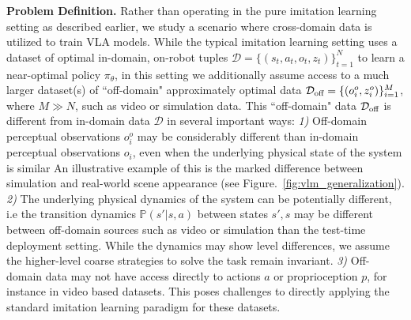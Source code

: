 \textbf{Problem Definition.}
Rather than operating in the pure imitation learning setting as described earlier, we study a scenario where cross-domain data is utilized to train VLA models. While the typical imitation learning setting uses a dataset of optimal in-domain, on-robot tuples $\mathcal{D} = \{(s_t, a_t, o_t, z_t)\}_{t=1}^N$ to learn a near-optimal policy $\pi_\theta$, in this setting we additionally assume access to a much larger dataset(s) of ``off-domain" approximately optimal data $\mathcal{D}_\text{off} = \{(o_i^o, z_i^o)\}_{i=1}^M$, where $M \gg N$, such as video or simulation data. This ``off-domain" data $\mathcal{D}_\text{off}$ is different from in-domain data $\mathcal{D}$ in several important ways: \emph{1)} Off-domain perceptual observations $o_i^o$ may be considerably different than in-domain perceptual observations $o_i$, even when the underlying physical state of the system is similar
An illustrative example of this is the marked difference between simulation and real-world scene appearance (see Figure.~\ref{fig:vlm_generalization}). \emph{2)} The underlying physical dynamics of the system can be potentially different, i.e the transition dynamics $\mathds{P}(s'|s, a)$ between states $s', s$ may be different between off-domain sources such as video or simulation than the test-time deployment setting. While the dynamics may show level differences, we assume the higher-level coarse strategies to solve the task remain invariant. \emph{3)} Off-domain data may not have access directly to actions $a$ or proprioception $p$, for instance in video based datasets. This poses challenges to directly applying the standard imitation learning paradigm for these datasets.

